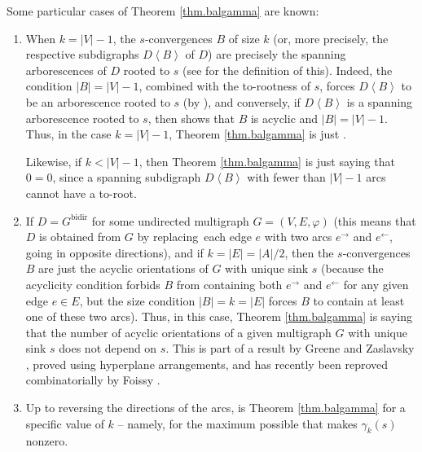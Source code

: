 \documentclass[numbers=enddot,12pt,final,onecolumn,notitlepage]{scrartcl}%
\theoremstyle{definition}
\theoremstyle{plainsl}
\begin{document}
Some particular cases of Theorem \ref{thm.balgamma} are known:

\begin{enumerate}
\item When $k=\left\vert V\right\vert -1$, the $s$-convergences $B$ of size
$k$ (or, more precisely, the respective subdigraphs $D\left\langle
B\right\rangle $ of $D$) are precisely the spanning arborescences of $D$
rooted to $s$ (see \cite[Definition 5.10.1 \textbf{(b)}]{22s} for the
definition of this). Indeed, the condition $\left\vert B\right\vert
=\left\vert V\right\vert -1$, combined with the to-rootness of $s$, forces
$D\left\langle B\right\rangle $ to be an arborescence rooted to $s$ (by
\cite[Theorem 5.10.5]{22s}), and conversely, if $D\left\langle B\right\rangle
$ is a spanning arborescence rooted to $s$, then \cite[Theorem 5.10.5]{22s}
shows that $B$ is acyclic and $\left\vert B\right\vert =\left\vert
V\right\vert -1$. Thus, in the case $k=\left\vert V\right\vert -1$, Theorem
\ref{thm.balgamma} is just \cite[Corollary 5.12.1]{22s}.

Likewise, if $k<\left\vert V\right\vert -1$, then Theorem \ref{thm.balgamma}
is just saying that $0=0$, since a spanning subdigraph $D\left\langle
B\right\rangle $ with fewer than $\left\vert V\right\vert -1$ arcs cannot have
a to-root.

\item If $D=G^{\operatorname*{bidir}}$ for some undirected multigraph
$G=\left(  V,E,\varphi\right)  $ (this means that $D$ is obtained from $G$ by
replacing\ each edge $e$ with two arcs $e^{\rightarrow}$ and $e^{\leftarrow}$,
going in opposite directions), and if $k=\left\vert E\right\vert =\left\vert
A\right\vert /2$, then the $s$-convergences $B$ are just the acyclic
orientations of $G$ with unique sink $s$ (because the acyclicity condition
forbids $B$ from containing both $e^{\rightarrow}$ and $e^{\leftarrow}$ for
any given edge $e\in E$, but the size condition $\left\vert B\right\vert
=k=\left\vert E\right\vert $ forces $B$ to contain at least one of these two
arcs). Thus, in this case, Theorem \ref{thm.balgamma} is saying that the
number of acyclic orientations of a given multigraph $G$ with unique sink $s$
does not depend on $s$. This is part of a result by Greene and Zaslavsky
\cite[Theorem 7.3]{GreZas83}, proved using hyperplane arrangements, and has
recently been reproved combinatorially by Foissy \cite[Proposition
4.6]{Foissy22}.

\item Up to reversing the directions of the arcs, \cite[Proposition
3.7]{PerPha15} is Theorem \ref{thm.balgamma} for a specific value of $k$ --
namely, for the maximum possible that makes $\gamma_{k}\left(  s\right)  $ nonzero.


\end{enumerate}
\end{document}
